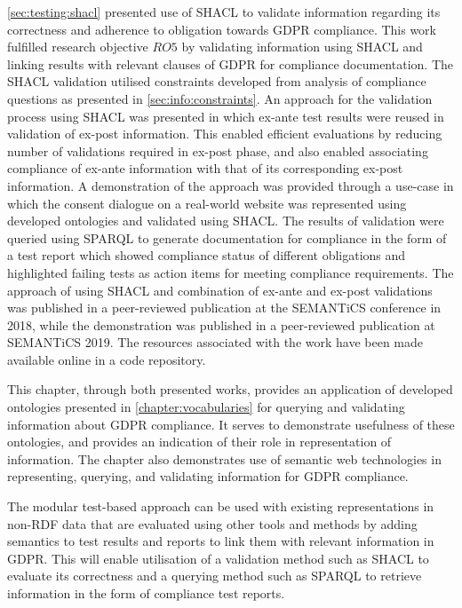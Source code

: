 \autoref{sec:testing:shacl} presented use of SHACL to validate information regarding its correctness and adherence to obligation towards GDPR compliance.
This work fulfilled research objective $RO5$ by validating information using SHACL and linking results with relevant clauses of GDPR for compliance documentation.
The SHACL validation utilised constraints developed from analysis of compliance questions as presented in \autoref{sec:info:constraints}.
An approach for the validation process using SHACL was presented in which ex-ante test results were reused in validation of ex-post information. This enabled efficient evaluations by reducing number of validations required in ex-post phase, and also enabled associating compliance of ex-ante information with that of its corresponding ex-post information.
A demonstration of the approach was provided through a use-case in which the consent dialogue on a real-world website was represented using developed ontologies and validated using SHACL.
The results of validation were queried using SPARQL to generate documentation for compliance in the form of a test report which showed compliance status of different obligations and highlighted failing tests as action items for meeting compliance requirements.
The approach of using SHACL and combination of ex-ante and ex-post validations was published in a peer-reviewed publication \cite{pandit_towards_2018} at the SEMANTiCS conference in 2018, while the demonstration was published in a peer-reviewed publication \cite{pandit_test-driven_2019} at SEMANTiCS 2019.
The resources associated with the work have been made available online in a code repository.

This chapter, through both presented works, provides an application of developed ontologies presented in \autoref{chapter:vocabularies} for querying and validating information about GDPR compliance.
It serves to demonstrate usefulness of these ontologies, and provides an indication of their role in representation of information.
The chapter also demonstrates use of semantic web technologies in representing, querying, and validating information for GDPR compliance.

The modular test-based approach can be used with existing representations in non-RDF data that are evaluated using other tools and methods by adding semantics to test results and reports to link them with relevant information in GDPR. This will enable utilisation of a validation method such as SHACL to evaluate its correctness and a querying method such as SPARQL to retrieve information in the form of compliance test reports. 

